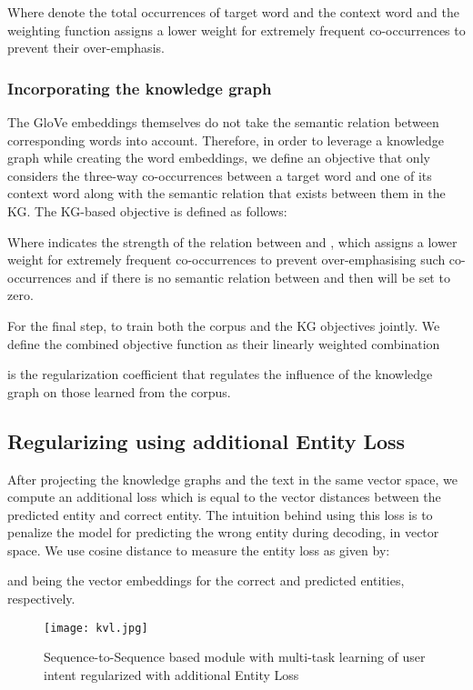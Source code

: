 \documentclass[runningheads]{llncs}
\begin{document}
Where  denote the total occurrences of target word  and the context word  and the weighting function  assigns a lower weight for extremely frequent co-occurrences to prevent their over-emphasis.
\subsubsection{Incorporating the knowledge graph}
The GloVe embeddings themselves do not take the semantic relation between corresponding words into account. Therefore, in order to leverage a knowledge graph while creating the word embeddings, we define an objective  that only considers the three-way co-occurrences between a target word  and one of its context word  along with the semantic relation  that exists between them in the KG. The KG-based objective is defined as follows:

Where  indicates the strength of the relation  between  and , which assigns a lower weight for extremely frequent co-occurrences to prevent over-emphasising such co-occurrences and if there is no semantic relation between  and  then  will be set to zero.

For the final step, to train both the corpus and the KG objectives jointly. We define the combined objective function  as their linearly weighted combination



  is the regularization coefficient that regulates the influence of the knowledge graph on those learned from the corpus.
 


\subsection{Regularizing using additional Entity Loss}

After projecting the knowledge graphs and the text in the same vector space, we compute an additional loss which is equal to the vector distances between the predicted entity and correct entity.
The intuition behind using this loss is to penalize the model for predicting the wrong entity during decoding, in vector space.
We use cosine distance to measure the entity loss as given by:


\noindent
 and  being the vector embeddings for the correct and predicted entities, respectively.

\begin{figure}
    \centering
    \texttt{[image: kvl.jpg]}
        \vspace{0.1cm}
        
    \caption{Sequence-to-Sequence based module with multi-task learning of user intent regularized with additional Entity Loss}
    \label{fig:model}
    \vspace{-0.5cm}
\end{figure}
\end{document}
